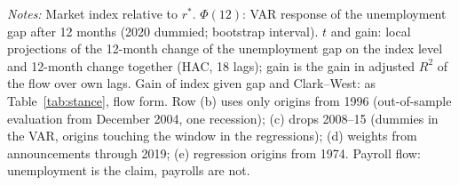\begin{table}[tbp]\centering\small
\caption{The Foundation on 1973--2026 and on 1996--2026}\label{tab:checks96}
\begin{flushleft}\footnotesize\textit{Notes:} Market index relative to $r^*$. $\Phi(12)$: VAR response of the unemployment gap after 12 months (2020 dummied; bootstrap interval). $t$ and gain: local projections of the 12-month change of the unemployment gap on the index level and 12-month change together (HAC, 18 lags); gain is the gain in adjusted $R^2$ of the flow over own lags. Gain of index given gap and Clark--West: as Table~\ref{tab:stance}, flow form. Row (b) uses only origins from 1996 (out-of-sample evaluation from December 2004, one recession); (c) drops 2008--15 (dummies in the VAR, origins touching the window in the regressions); (d) weights from announcements through 2019; (e) regression origins from 1974. Payroll flow: unemployment is the claim, payrolls are not.\end{flushleft}
\end{table}
